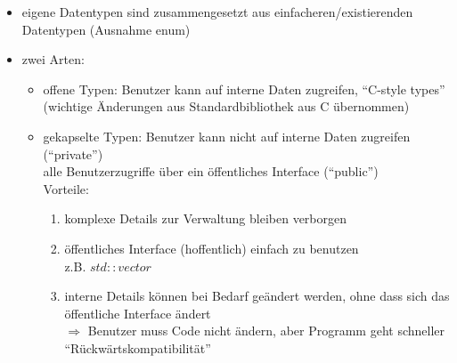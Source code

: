 \documentclass{article}
\begin{document}
	\begin{itemize}
		\item eigene Datentypen sind zusammengesetzt aus einfacheren/existierenden Datentypen (Ausnahme enum)
		\item zwei Arten:
		\begin{itemize}
			\item offene Typen: Benutzer kann auf interne Daten zugreifen, ``C-style types'' (wichtige Änderungen aus Standardbibliothek aus C übernommen)
			\item gekapselte Typen: Benutzer kann nicht auf interne Daten zugreifen (``private'') \\
			alle Benutzerzugriffe über ein öffentliches Interface (``public'') \\
			Vorteile:
			\begin{enumerate}
				\item komplexe Details zur Verwaltung bleiben verborgen
				\item öffentliches Interface (hoffentlich) einfach zu benutzen \\
				z.B. $std::vector$
				\item interne Details können bei Bedarf geändert werden, ohne dass sich das öffentliche Interface ändert \\
				$\Rightarrow$ Benutzer muss Code nicht ändern, aber Programm geht schneller \\
				``Rückwärtskompatibilität''
			\end{enumerate}
		\end{itemize}
	\end{itemize}
\end{document}
